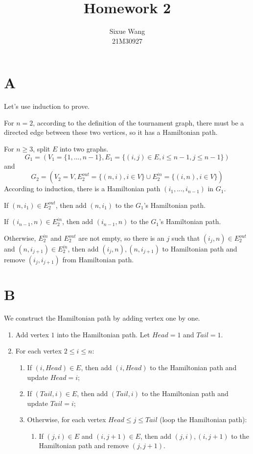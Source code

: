 \documentclass{article}
\title{Homework 2}
\author{Sixue Wang\\21M30927}
\begin{document}
\maketitle

\section*{A}
Let's use induction to prove.

For $n=2$, according to the definition of the tournament graph, there must be a directed edge between these two vertices, so it has a Hamiltonian path.

For $n \geq 3$, split $E$ into two graphs.
\begin{equation*}
  G_1 = (V_1=\{1,...,n-1\}, E_1=\{(i,j) \in E, i \le n-1, j \le n-1\})
\end{equation*}
and
\begin{equation*}
  G_2 = (V_2=V, E_2^{out}= \{(n,i), i \in V\} \cup E_2^{in} = \{(i,n), i \in V\})
\end{equation*}
According to induction, there is a Hamiltonian path $(i_1,...,i_{n-1})$ in $G_1$.

If $(n, i_1) \in E_2^{out}$, then add $(n, i_1)$ to the $G_1$'s Hamiltonian path.

If $(i_{n-1}, n) \in E_2^{in}$, then add $(i_{n-1}, n)$ to the $G_1$'s Hamiltonian path.

Otherwise, $E_2^{in}$ and $E_2^{out}$ are not empty, so there is an $j$ such that $(i_j, n) \in E_2^{out}$ and $(n, i_{j+1}) \in E_2^{in}$, then add $(i_j,n), (n, i_{j+1})$ to Hamiltonian path and remove $(i_j, i_{j+1})$ from Hamiltonian path.

\section*{B}
We construct the Hamiltonian path by adding vertex one by one.

\begin{enumerate}
  \item Add vertex $1$ into the Hamiltonian path. Let $Head = 1$ and $Tail = 1$.
  \item For each vertex $2 \leq i \leq n$:
    \begin{enumerate}
      \item If $(i, Head) \in E$, then add $(i, Head)$ to the Hamiltonian path and update $Head = i$;
      \item If $(Tail, i) \in E$, then add $(Tail, i)$ to the Hamiltonian path and update $Tail = i$;
      \item Otherwise, for each vertex $Head \leq j \leq Tail$ (loop the Hamiltonian path):
      \begin{enumerate}
        \item If $(j, i) \in E$ and $(i, j+1) \in E$, then add $(j, i), (i, j+1)$ to the Hamiltonian path and remove $(j, j+1)$.
      \end{enumerate}
    \end{enumerate}
\end{enumerate}
\end{document}
